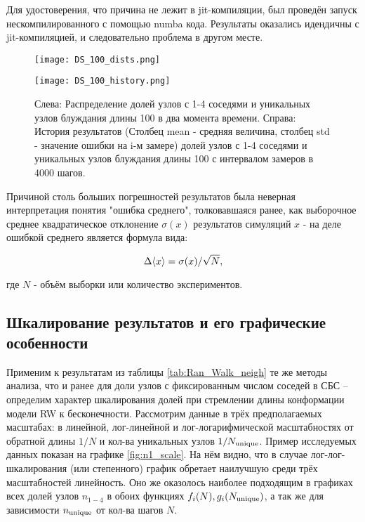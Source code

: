 Для удостоверения, что причина не лежит в jit-компиляции, был проведён запуск нескомпилированного с помощью numba кода. Результаты оказались идендичны с jit-компиляцией, и следовательно проблема в другом месте.

\begin{figure}
	\caption{Слева: Распределение долей узлов с 1-4 соседями и уникальных узлов блуждания длины 100 в два момента времени. Справа: История результатов (Столбец mean - средняя величина, столбец std - значение ошибки на i-м замере) долей узлов с 1-4 соседями и уникальных узлов блуждания длины 100 с интервалом замеров в 4000 шагов.}
     \label{fig:DS_100_dists_history}
\begin{minipage}{0.32\textwidth}
     \texttt{[image: DS\_100\_dists.png]}
\end{minipage}
\begin{minipage}{0.67\textwidth}
     \texttt{[image: DS\_100\_history.png]}
\end{minipage}
	
\end{figure}


Причиной столь больших погрешностей результатов была неверная интерпретация понятия "ошибка среднего", толковавшаяся ранее, как выборочное среднее квадратическое отклонение $\sigma(x)$ результатов симуляций $x$ - на деле ошибкой среднего является формула вида:

\[\Delta\langle x \rangle = \sigma(x)/\sqrt{N},\]

где  $N$ - объём выборки или количество экспериментов.


\subsection{Шкалирование результатов и его графические особенности}

Применим к результатам из таблицы \ref{tab:Ran_Walk_neigh} те же методы анализа, что и ранее для доли узлов с фиксированным числом соседей в СБС -- определим характер шкалирования долей при стремлении длины конформации модели RW к бесконечности.
Рассмотрим данные в трёх предполагаемых масштабах: в линейной, лог-линейной и лог-логарифмической масштабностях от обратной длины $1/N$ и кол-ва уникальных узлов $1/N_{\textup{unique}}$.
Пример исследуемых данных показан на графике \ref{fig:n1_scale}. 
На нём видно, что в случае лог-лог-шкалирования (или степенного) график обретает наилучшую среди трёх масштабностей линейность.
Оно же оказолось наиболее подходящим в графиках всех долей узлов $n_{1-4}$ в обоих функциях $f_i(N), g_i(N_{\textup{unique}})$, а так же для зависимости $n_{\textup{unique}}$ от кол-ва шагов $N$.

